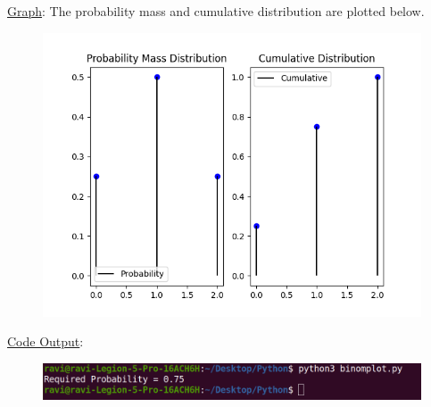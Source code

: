 \documentclass[journal,12pt,twocolumn]{IEEEtran}
\begin{document}
\underline{Graph}: The probability mass and cumulative distribution are plotted below.
\begin{figure}[!ht]
  \centering
  \includegraphics[width=\columnwidth]{../Figures/binom.png}
  \label{fig:Dis}
\end{figure}

\underline{Code Output}:
\begin{figure}[!ht]
  \centering
  \includegraphics[width=\columnwidth]{../Figures/coin_output.png}
  \label{fig:Output}
\end{figure}

  
\end{document}

